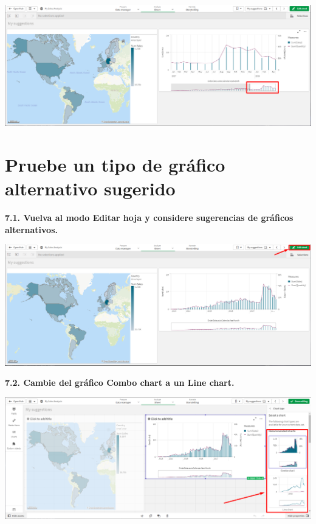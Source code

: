 \documentclass{article}
\begin{document}
    \begin{center}
		\includegraphics[width=14cm]{./images/22.3} 
	\end{center}

\newpage


\section{Pruebe un tipo de gráfico alternativo sugerido}

\textbf{7.1. Vuelva al modo \textbf{Editar hoja} y considere 
sugerencias de gráficos alternativos.}

    \begin{center}
		\includegraphics[width=14cm]{./images/23} 
	\end{center}

\textbf{7.2. Cambie del gráfico \textbf{Combo chart} a 
un \textbf{Line chart}.}

    \begin{center}
		\includegraphics[width=14cm]{./images/23.1} 
	\end{center}
	\newpage
\end{document}
